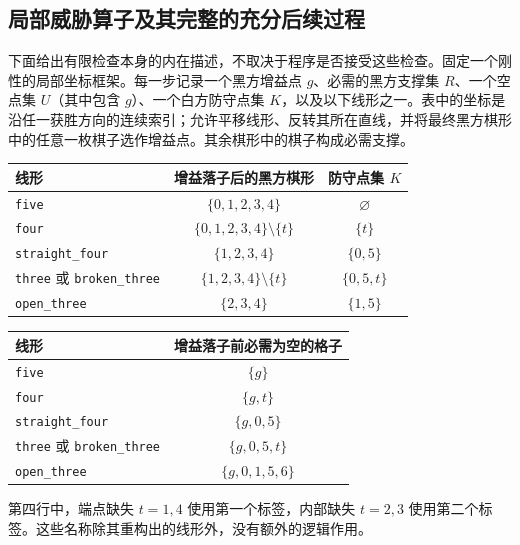 \documentclass[11pt]{article}
\theoremstyle{definition}
\theoremstyle{remark}
\begin{document}
\subsection{局部威胁算子及其完整的充分后续过程}\label{mac:local-section}

下面给出有限检查本身的内在描述，不取决于程序是否接受这些检查。固定一个刚性的局部坐标框架。每一步记录一个黑方增益点 \(g\)、必需的黑方支撑集 \(R\)、一个空点集 \(U\)（其中包含 \(g\)）、一个白方防守点集 \(K\)，以及以下线形之一。表中的坐标是沿任一获胜方向的连续索引；允许平移线形、反转其所在直线，并将最终黑方棋形中的任意一枚棋子选作增益点。其余棋形中的棋子构成必需支撑。

\begin{center}
\small
\renewcommand{\arraystretch}{1.25}
\begin{tabular}{@{}lcc@{}}
\hline
线形 & 增益落子后的黑方棋形 & 防守点集 $K$ \\
\hline
\texttt{five} & $\{0,1,2,3,4\}$ & $\varnothing$ \\
\texttt{four} & $\{0,1,2,3,4\}\setminus\{t\}$ & $\{t\}$ \\
\texttt{straight\_four} & $\{1,2,3,4\}$ & $\{0,5\}$ \\
\texttt{three} 或 \texttt{broken\_three} & $\{1,2,3,4\}\setminus\{t\}$ & $\{0,5,t\}$ \\
\texttt{open\_three} & $\{2,3,4\}$ & $\{1,5\}$ \\
\hline
\end{tabular}
\par\medskip
\begin{tabular}{@{}lc@{}}
\hline
线形 & 增益落子前必需为空的格子 \\
\hline
\texttt{five} & $\{g\}$ \\
\texttt{four} & $\{g,t\}$ \\
\texttt{straight\_four} & $\{g,0,5\}$ \\
\texttt{three} 或 \texttt{broken\_three} & $\{g,0,5,t\}$ \\
\texttt{open\_three} & $\{g,0,1,5,6\}$ \\
\hline
\end{tabular}
\end{center}

第四行中，端点缺失 \(t=1,4\) 使用第一个标签，内部缺失 \(t=2,3\) 使用第二个标签。这些名称除其重构出的线形外，没有额外的逻辑作用。
\end{document}
